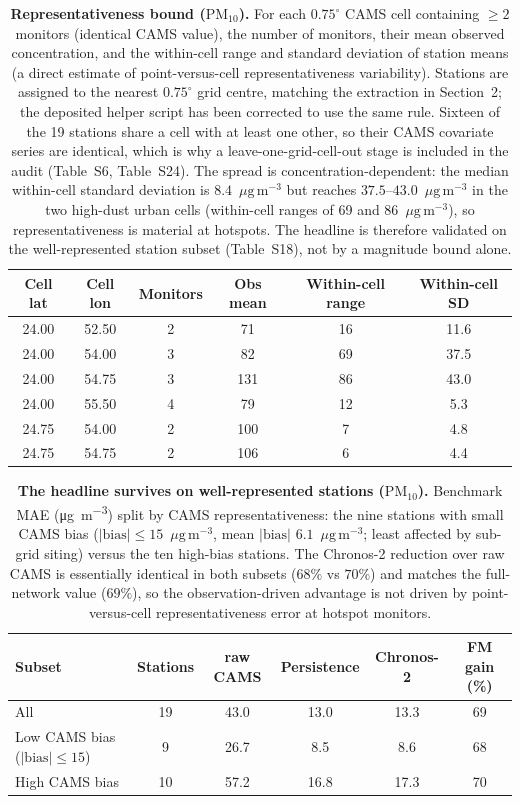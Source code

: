 \documentclass[11pt]{article}
\newcommand*{\ugm}{\ensuremath{\mu\mathrm{g\,m^{-3}}}}
\newcommand*{\pmten}{\ensuremath{\mathrm{PM_{10}}}}
\begin{document}
\begin{table}[htbp]\centering\footnotesize
\caption{\textbf{Representativeness bound (\pmten{}).} For each $0.75^\circ$ CAMS cell containing $\geq2$ monitors (identical CAMS value), the number of monitors, their mean observed concentration, and the within-cell range and standard deviation of station means (a direct estimate of point-versus-cell representativeness variability). Stations are assigned to the nearest $0.75^\circ$ grid centre, matching the extraction in Section~2; the deposited helper script has been corrected to use the same rule. Sixteen of the 19 stations share a cell with at least one other, so their CAMS covariate series are identical, which is why a leave-one-grid-cell-out stage is included in the audit (Table~S6, Table~S24). The spread is concentration-dependent: the median within-cell standard deviation is $8.4$~\ugm{} but reaches $37.5$--$43.0$~\ugm{} in the two high-dust urban cells (within-cell ranges of 69 and 86~\ugm), so representativeness is material at hotspots. The headline is therefore validated on the well-represented station subset (Table~S18), not by a magnitude bound alone.}
\begin{tabular}{cccccc}\toprule
Cell lat & Cell lon & Monitors & Obs mean & Within-cell range & Within-cell SD \\ \midrule
24.00 & 52.50 & 2 & 71 & 16 & 11.6 \\
24.00 & 54.00 & 3 & 82 & 69 & 37.5 \\
24.00 & 54.75 & 3 & 131 & 86 & 43.0 \\
24.00 & 55.50 & 4 & 79 & 12 & 5.3 \\
24.75 & 54.00 & 2 & 100 & 7 & 4.8 \\
24.75 & 54.75 & 2 & 106 & 6 & 4.4 \\
\bottomrule\end{tabular}\end{table}

\begin{table}[htbp]\centering\footnotesize
\caption{\textbf{The headline survives on well-represented stations (\pmten{}).} Benchmark MAE (\si{\micro\gram\per\cubic\metre}) split by CAMS representativeness: the nine stations with small CAMS bias ($|\text{bias}|\leq15$~\ugm, mean $|\text{bias}|$ $6.1$~\ugm; least affected by sub-grid siting) versus the ten high-bias stations. The Chronos-2 reduction over raw CAMS is essentially identical in both subsets ($68\%$ vs $70\%$) and matches the full-network value ($69\%$), so the observation-driven advantage is not driven by point-versus-cell representativeness error at hotspot monitors.}
\begin{tabular}{lccccc}\toprule
Subset & Stations & raw CAMS & Persistence & Chronos-2 & FM gain (\%) \\ \midrule
All & 19 & 43.0 & 13.0 & 13.3 & 69 \\
Low CAMS bias ($|\text{bias}|\leq15$) & 9 & 26.7 & 8.5 & 8.6 & 68 \\
High CAMS bias & 10 & 57.2 & 16.8 & 17.3 & 70 \\
\bottomrule\end{tabular}\end{table}
\end{document}
